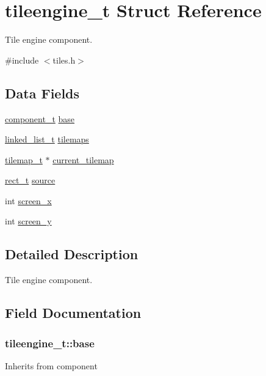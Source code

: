 \hypertarget{structtileengine__t}{}\section{tileengine\+\_\+t Struct Reference}
\label{structtileengine__t}


Tile engine component.  




{\ttfamily \#include $<$tiles.\+h$>$}

\subsection*{Data Fields}
\begin{DoxyCompactItemize}
\item 
\hyperlink{structcomponent__t}{component\+\_\+t} \hyperlink{structtileengine__t_a2bc269e9bc59aa063305bbfb9c1b1e90}{base}
\item 
\hyperlink{structlinked__list__t}{linked\+\_\+list\+\_\+t} \hyperlink{structtileengine__t_ab5bfc8e174c326d26fb236c238730c1f}{tilemaps}
\item 
\hyperlink{structtilemap__t}{tilemap\+\_\+t} $\ast$ \hyperlink{structtileengine__t_a4ccb3297bc25e903bdd96dafed96dde0}{current\+\_\+tilemap}
\item 
\hyperlink{structrect__t}{rect\+\_\+t} \hyperlink{structtileengine__t_ab8d030de148154d3ce462b94a8e4dc6f}{source}
\item 
int \hyperlink{structtileengine__t_af49eaed92e5e773f88890a251de4e907}{screen\+\_\+x}
\item 
int \hyperlink{structtileengine__t_a0c0e11401653f0e4d6bcc5d6727b4a0c}{screen\+\_\+y}
\end{DoxyCompactItemize}


\subsection{Detailed Description}
Tile engine component. 

\subsection{Field Documentation}
\subsubsection[{\texorpdfstring{base}{base}}]{ tileengine\+\_\+t\+::base}\hypertarget{structtileengine__t_a2bc269e9bc59aa063305bbfb9c1b1e90}{}\label{structtileengine__t_a2bc269e9bc59aa063305bbfb9c1b1e90}
Inherits from component 

